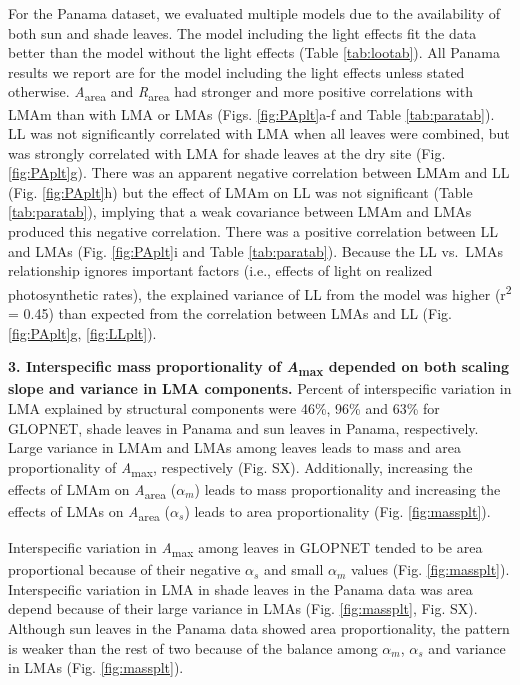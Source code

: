 \documentclass[
  12pt,
]{article}
\providecommand{\DIFaddtex}[1]{{\protect\color{blue}\uwave{#1}}} %
\providecommand{\DIFdeltex}[1]{{\protect\color{red}\sout{#1}}}                      %
\providecommand{\DIFaddbegin}{} %
\providecommand{\DIFaddend}{} %
\providecommand{\DIFdelbegin}{} %
\providecommand{\DIFdelend}{} %
\providecommand{\DIFadd}[1]{\texorpdfstring{\DIFaddtex{#1}}{#1}} %
\providecommand{\DIFdel}[1]{\texorpdfstring{\DIFdeltex{#1}}{}} %
\newcommand{\DIFscaledelfig}{0.5}
\newlength{\DIFdelgraphicswidth} %
\newlength{\DIFdelgraphicsheight} %
\newcommand{\DIFaddincludegraphics}[2][]{{\color{blue}\fbox{\DIFOincludegraphics[#1]{#2}}}} %
\newcommand{\DIFdelincludegraphics}[2][]{%
\sbox{\DIFdelgraphicsbox}{\DIFOincludegraphics[#1]{#2}}%
\settoboxwidth{\DIFdelgraphicswidth}{\DIFdelgraphicsbox} %
\settoboxtotalheight{\DIFdelgraphicsheight}{\DIFdelgraphicsbox} %
\scalebox{\DIFscaledelfig}{%
\parbox[b]{\DIFdelgraphicswidth}{\usebox{\DIFdelgraphicsbox}\\[-\baselineskip] \rule{\DIFdelgraphicswidth}{0em}}\llap{\resizebox{\DIFdelgraphicswidth}{\DIFdelgraphicsheight}{%
\setlength{\unitlength}{\DIFdelgraphicswidth}%
\begin{picture}(1,1)%
\thicklines\linethickness{2pt} %
{\color[rgb]{1,0,0}\put(0,0){\framebox(1,1){}}}%
{\color[rgb]{1,0,0}\put(0,0){\line( 1,1){1}}}%
{\color[rgb]{1,0,0}\put(0,1){\line(1,-1){1}}}%
\end{picture}%
}\hspace*{3pt}}} %
} %
\DeclareRobustCommand{\DIFaddbegin}{\DIFOaddbegin \let\includegraphics\DIFaddincludegraphics} %
\DeclareRobustCommand{\DIFaddend}{\DIFOaddend \let\includegraphics\DIFOincludegraphics} %
\DeclareRobustCommand{\DIFdelbegin}{\DIFOdelbegin \let\includegraphics\DIFdelincludegraphics} %
\DeclareRobustCommand{\DIFdelend}{\DIFOaddend \let\includegraphics\DIFOincludegraphics} %
\begin{document}
For the Panama dataset, we evaluated multiple models due to the availability of both sun and shade leaves.
The model including the light effects fit the data better than the model without the light effects (Table \ref{tab:lootab}).
All Panama results we report are for the model including the light effects unless stated otherwise.
\emph{A}\textsubscript{area} and \emph{R}\textsubscript{area} had stronger and more positive correlations with LMAm than with LMA or LMAs (Figs. \ref{fig:PAplt}a-f and Table \ref{tab:paratab}).
LL was not significantly correlated with LMA when all leaves were combined, but was strongly correlated with LMA for shade leaves at the dry site (Fig. \ref{fig:PAplt}g).
There was an apparent negative correlation between LMAm and LL (Fig. \ref{fig:PAplt}h) but the effect of LMAm on LL was not significant (Table \ref{tab:paratab}), implying that a weak covariance between LMAm and LMAs produced this negative correlation.
There was a positive correlation between LL and LMAs (Fig. \ref{fig:PAplt}i and Table \ref{tab:paratab}).
Because the LL vs.~LMAs relationship ignores important factors (i.e., effects of light on realized photosynthetic rates), the explained variance of LL from the model was higher (r\textsuperscript{2} = 0.45) than expected from the correlation between LMAs and LL (Fig. \ref{fig:PAplt}g, \DIFaddbegin \DIFadd{Fig.~}\DIFaddend \ref{fig:LLplt}).

\textbf{3. Interspecific mass proportionality of \emph{A}\textsubscript{max} depended on both scaling slope and variance in LMA components.}
Percent of interspecific variation in LMA explained by structural components were 46\%, 96\% and 63\% for GLOPNET, shade leaves in Panama and sun leaves in Panama, respectively.
Large variance in LMAm and LMAs among leaves leads to mass and area proportionality of \emph{A}\textsubscript{max}, respectively (Fig. SX). Additionally, increasing the effects of LMAm on \emph{A}\textsubscript{area} (\DIFdelbegin \DIFdel{\(\alpha_m\)}\DIFdelend \DIFaddbegin \DIFadd{\(\alpha_p\)}\DIFaddend ) leads to mass proportionality and increasing the effects of LMAs on \emph{A}\textsubscript{area} (\(\alpha_s\)) leads to area proportionality (Fig. \DIFaddbegin \DIFadd{Fig.~}\DIFaddend \ref{fig:massplt}).

Interspecific variation in \emph{A}\textsubscript{max} among leaves in GLOPNET tended to be area proportional because of their negative \(\alpha_s\) and small \DIFdelbegin \DIFdel{\(\alpha_m\) }\DIFdelend \DIFaddbegin \DIFadd{\(\alpha_p\) }\DIFaddend values (Fig. \DIFaddbegin \DIFadd{Fig.~}\DIFaddend \ref{fig:massplt}).
Interspecific variation in LMA in shade leaves in the Panama data was area depend because of their large variance in LMAs (Fig. \DIFaddbegin \DIFadd{Fig.~}\DIFaddend \ref{fig:massplt}, Fig. SX).
Although sun leaves in the Panama data showed area proportionality, the
pattern is weaker than the rest of two because of the balance among \DIFdelbegin \DIFdel{\(\alpha_m\)}\DIFdelend \DIFaddbegin \DIFadd{\(\alpha_p\)}\DIFaddend , \(\alpha_s\) and variance in LMAs (Fig. \DIFaddbegin \DIFadd{Fig.~}\DIFaddend \ref{fig:massplt}).
\end{document}
